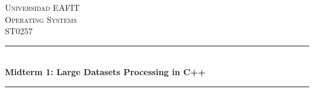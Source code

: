 %
%
%


\newcommand{\projectTitle}{Midterm 1: Large Datasets Processing in C++}
\newcommand{\classCode}{ST0257}
\newcommand{\className}{Operating Systems}


\begin{titlepage} %
	\newcommand{\HRule}{\rule{\linewidth}{0.5mm}} %

	\center %


	\textsc{\LARGE Universidad EAFIT}\\[1.5cm] %


	\textsc{\Large \className}\\[0.5cm] %
	\textsc{\large \classCode}\\[0.5cm] %


	\HRule\\[0.4cm]
	{\huge\bfseries \projectTitle}\\[0.4cm] %

	\HRule\\[1.5cm]



\end{titlepage}
